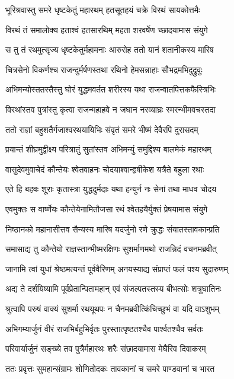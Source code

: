 \twolineshloka
{भूरिश्रवास्तु समरे धृष्टकेतुं महारथम्}
{हतसूतहयं चक्रे विरथं सायकोत्तमैः}


\twolineshloka
{विरथं तं समालोक्य हताश्वं हतसारथिम्}
{महता शरवर्षेण च्छादयामास संयुगे}


\twolineshloka
{स तु तं रथमुत्सृज्य धृष्टकेतुर्महामनाः}
{आरुरोह ततो यानं शतानीकस्य मारिष}


\twolineshloka
{चित्रसेनो विकर्णश्च राजन्दुर्मर्षणस्तथा}
{रथिनो हेमसन्नाहाः सौभद्रमभिदुद्रुवुः}


\twolineshloka
{अभिमन्योस्ततस्तैस्तु घोरं युद्धमवर्तत}
{शरीरस्य यथा राजन्वातपित्तकफैस्त्रिभिः}


\twolineshloka
{विरथांस्तव पुत्रांस्तु कृत्वा राजन्महाहवे}
{न जघान नरव्याघ्रः स्मरन्भीमवचस्तदा}


\twolineshloka
{ततो राज्ञां बहुशतैर्गजाश्वरथयायिभिः}
{संवृतं समरे भीष्मं देवैरपि दुरासदम्}


\twolineshloka
{प्रयान्तं शीघ्रमुद्वीक्ष्य परित्रातुं सुतांस्तव}
{अभिमन्युं समुद्दिश्य बालमेकं महारथम्}


\twolineshloka
{वासुदेवमुवाचेदं कौन्तेयः श्वेतवाहनः}
{चोदयाश्वान्हृषीकेश यत्रैते बहुला रथाः}


\twolineshloka
{एते हि बहवः शूराः कृतास्त्रा युद्धदुर्मदाः}
{यथा हन्युर्न नः सेनां तथा माधव चोदय}


\twolineshloka
{एवमुक्तः स वार्ष्णेयः कौन्तेयेनामितौजसा}
{रथं श्वेतहयैर्युक्तं प्रेषयामास संयुगे}


\twolineshloka
{निष्ठानको महानासीत्तव सैन्यस्य मारिष}
{यदर्जुनो रणे क्रुद्धः संयातस्तावकान्प्रति}


\twolineshloka
{समासाद्य तु कौन्तेयो राज्ञस्तान्भीष्मरक्षिणः}
{सुशर्माणमथो राजन्निदं वचनमब्रवीत्}


\twolineshloka
{जानामि त्वां युधां श्रेष्ठमत्यन्तं पूर्ववैरिणम्}
{अनयस्याद्य संप्राप्तं फलं पश्य सुदारुणम्}


\twolineshloka
{अद्य ते दर्शयिष्यामि पूर्वप्रेतान्पितामहान्}
{एवं संजल्पतस्तस्य बीभत्सोः शत्रुघातिनः}


\twolineshloka
{श्रुत्वापि परुषं वाक्यं सुशर्मा रथयूथपः}
{न चैनमब्रवीत्किंचिच्छुभं वा यदि वाऽशुभम्}


\twolineshloka
{अभिगम्यार्जुनं वीरं राजभिर्बहुभिर्वृतः}
{पुरस्तात्पृष्ठतश्चैव पार्श्वतश्चैव सर्वतः}


\twolineshloka
{परिवार्यार्जुनं सङ्ख्ये तव पुत्रैर्महारथः}
{शरैः संछादयामास मेघैरिव दिवाकरम्}


\twolineshloka
{ततः प्रवृत्तः सुमहान्संग्रामः शोणितोदकः}
{तावकानां च समरे पाण्डवानां च भारत}


